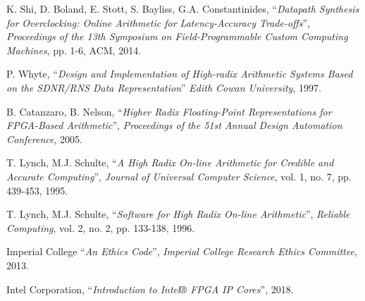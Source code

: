 \documentclass[journal]{IEEEtran}
\begin{document}
\begin{thebibliography}{1}
  K. Shi, D. Boland, E. Stott, S. Bayliss, G.A. Constantinides,
  ``\textit{Datapath Synthesis for Overclocking: Online Arithmetic for
  Latency-Accuracy Trade-offs}'',
  \textit{Proceedings of the 13th Symposium on Field-Programmable Custom
  Computing Machines},
  pp. 1-6, ACM,
  2014.

  P. Whyte,
  ``\textit{Design and Implementation of High-radix Arithmetic Systems Based
  on the SDNR/RNS Data Representation}''
  \textit{Edith Cowan University},
  1997.

  B. Catanzaro, B. Nelson,
  ``\textit{Higher Radix Floating-Point Representations for FPGA-Based
  Arithmetic}'',
  \textit{Proceedings of the 51st Annual Design Automation Conference},
  2005.

  T. Lynch, M.J. Schulte,
  ``\textit{A High Radix On-line Arithmetic for Credible and Accurate
  Computing}'',
  \textit{Journal of Universal Computer Science}, vol. 1, no. 7, pp. 439-453,
  1995.

  T. Lynch, M.J. Schulte,
  ``\textit{Software for High Radix On-line Arithmetic}'',
  \textit{Reliable Computing}, vol. 2, no. 2, pp. 133-138,
  1996.

  Imperial College
  ``\textit{An Ethics Code}'',
  \textit{Imperial College Research Ethics Committee},
  2013.

  Intel Corporation,
  ``\textit{Introduction to Intel® FPGA IP Cores}'',
  2018.

\end{thebibliography}
\end{document}
